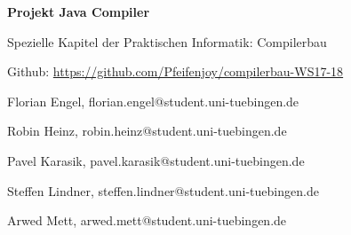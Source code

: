 \begin{frame}[standout]

\flushleft

\textbf{Projekt Java Compiler}

\small{Spezielle Kapitel der Praktischen Informatik: Compilerbau}

Github: \href{https://github.com/Pfeifenjoy/compilerbau-WS17-18}{https://github.com/Pfeifenjoy/compilerbau-WS17-18}

\vspace{1.5cm}

\begin{small}
	Florian Engel, florian.engel@student.uni-tuebingen.de
	
	Robin Heinz, robin.heinz@student.uni-tuebingen.de
	
	Pavel Karasik, pavel.karasik@student.uni-tuebingen.de
	
	Steffen Lindner, steffen.lindner@student.uni-tuebingen.de
	
	Arwed Mett, arwed.mett@student.uni-tuebingen.de
\end{small}
\end{frame}
